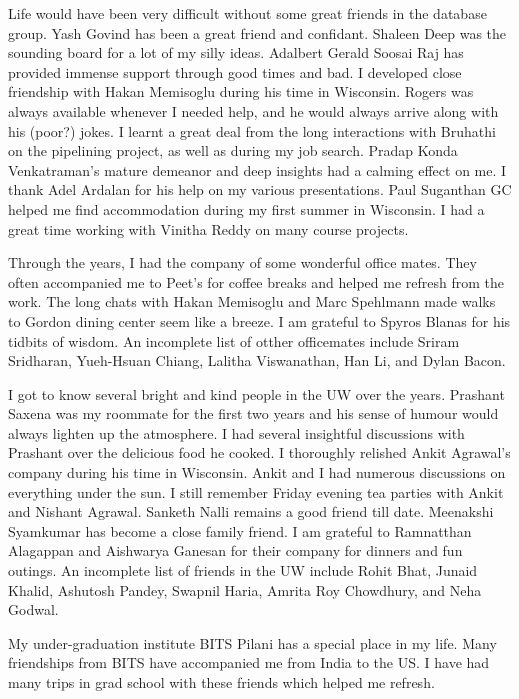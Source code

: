 Life would have been very difficult without some great friends in the database group. 
Yash Govind has been a great friend and confidant.
Shaleen Deep was the sounding board for a lot of my silly ideas.
Adalbert Gerald Soosai Raj has provided immense support through good times and bad. 
I developed close friendship with Hakan Memisoglu during his time in Wisconsin.
Rogers was always available whenever I needed help, and he would always arrive along with his (poor?) jokes. 
I learnt a great deal from the long interactions with Bruhathi on the pipelining project, as well as during my job search.
Pradap Konda Venkatraman's mature demeanor and deep insights had a calming effect on me.
I thank Adel Ardalan for his help on my various presentations. 
Paul Suganthan GC helped me find accommodation during my first summer in Wisconsin. 
I had a great time working with Vinitha Reddy on many course projects.

Through the years, I had the company of some wonderful office mates. 
They often accompanied me to Peet's for coffee breaks and helped me refresh from the work.
The long chats with Hakan Memisoglu and Marc Spehlmann made walks to Gordon dining center seem like a breeze.
I am grateful to Spyros Blanas for his tidbits of wisdom. 
An incomplete list of otther officemates include Sriram Sridharan, Yueh-Hsuan Chiang, Lalitha Viswanathan, Han Li, and Dylan Bacon.

I got to know several bright and kind people in the UW over the years. 
Prashant Saxena was my roommate for the first two years and his sense of humour would always lighten up the atmosphere. 
I had several insightful discussions with Prashant over the delicious food he cooked. 
I thoroughly relished Ankit Agrawal's company during his time in Wisconsin.
Ankit and I had numerous discussions on everything under the sun.
I still remember Friday evening tea parties with Ankit and Nishant Agrawal. 
Sanketh Nalli remains a good friend till date.
Meenakshi Syamkumar has become a close family friend. 
I am grateful to Ramnatthan Alagappan and Aishwarya Ganesan for their company for dinners and fun outings.
An incomplete list of friends in the UW include Rohit Bhat, Junaid Khalid, Ashutosh Pandey, Swapnil Haria, Amrita Roy Chowdhury, and Neha Godwal. 

My under-graduation institute BITS Pilani has a special place in my life.
Many friendships from BITS have accompanied me from India to the US. 
I have had many trips in grad school with these friends which helped me refresh.

